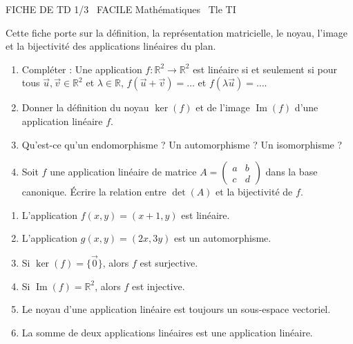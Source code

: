 \documentclass[11pt]{article}
\begin{document}
\begin{tcolorbox}[enhanced,colback=popink,colframe=popink,arc=10pt,boxrule=0pt,left=12pt,right=12pt,top=9pt,bottom=9pt]
{\color{white}\popxbold\small FICHE DE TD 1/3 \textbullet\ FACILE \hfill Mathématiques \textbullet\ Tle TI\par}
\end{tcolorbox}
\vspace{4pt}
Cette fiche porte sur la définition, la représentation matricielle, le noyau, l'image et la bijectivité des applications linéaires du plan.

\begin{exercice}
\begin{enumerate}
    \item Compléter : Une application $f : \mathbb{R}^2 \to \mathbb{R}^2$ est linéaire si et seulement si pour tous $\vec{u}, \vec{v} \in \mathbb{R}^2$ et $\lambda \in \mathbb{R}$, $f(\vec{u}+\vec{v}) = \dots$ et $f(\lambda\vec{u}) = \dots$.
    \item Donner la définition du noyau $\ker(f)$ et de l'image $\operatorname{Im}(f)$ d'une application linéaire $f$.
    \item Qu'est-ce qu'un endomorphisme ? Un automorphisme ? Un isomorphisme ?
    \item Soit $f$ une application linéaire de matrice $A = \begin{pmatrix} a & b \\ c & d \end{pmatrix}$ dans la base canonique. Écrire la relation entre $\det(A)$ et la bijectivité de $f$.
\end{enumerate}
\end{exercice}

\begin{exercice}
\begin{enumerate}
    \item L'application $f(x,y) = (x+1, y)$ est linéaire.
    \item L'application $g(x,y) = (2x, 3y)$ est un automorphisme.
    \item Si $\ker(f) = \{\vec{0}\}$, alors $f$ est surjective.
    \item Si $\operatorname{Im}(f) = \mathbb{R}^2$, alors $f$ est injective.
    \item Le noyau d'une application linéaire est toujours un sous-espace vectoriel.
    \item La somme de deux applications linéaires est une application linéaire.
\end{enumerate}
\end{exercice}
\end{document}
